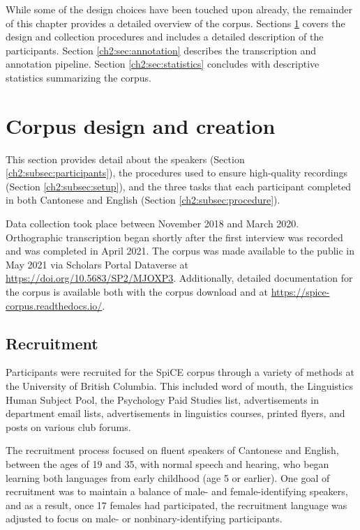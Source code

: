 While some of the design choices have been touched upon already, the remainder of this chapter provides a detailed overview of the corpus. Sections \ref{ch2:sec:design} covers the design and collection procedures and includes a detailed description of the participants. Section \ref{ch2:sec:annotation} describes the transcription and annotation pipeline. Section \ref{ch2:sec:statistics} concludes with descriptive statistics summarizing the corpus. 

\section{Corpus design and creation}\label{ch2:sec:design}

This section provides detail about the speakers (Section \ref{ch2:subsec:participants}), the procedures used to ensure high-quality recordings (Section \ref{ch2:subsec:setup}), and the three tasks that each participant completed in both Cantonese and English (Section \ref{ch2:subsec:procedure}). 

Data collection took place between November 2018 and March 2020. Orthographic transcription began shortly after the first interview was recorded and was completed in April 2021. The corpus was made available to the public in May 2021 via Scholars Portal Dataverse at \url{https://doi.org/10.5683/SP2/MJOXP3}. Additionally, detailed documentation for the corpus is available both with the corpus download and at \url{https://spice-corpus.readthedocs.io/}.

\subsection{Recruitment}

Participants were recruited for the SpiCE corpus through a variety of methods at the University of British Columbia. This included word of mouth, the Linguistics Human Subject Pool, the Psychology Paid Studies list, advertisements in department email lists, advertisements in linguistics courses, printed flyers, and posts on various club forums. 

The recruitment process focused on fluent speakers of Cantonese and English, between the ages of 19 and 35, with normal speech and hearing, who began learning both languages from early childhood (age 5 or earlier). One goal of recruitment was to maintain a balance of male- and female-identifying speakers, and as a result, once 17 females had participated, the recruitment language was adjusted to focus on male- or nonbinary-identifying participants.

